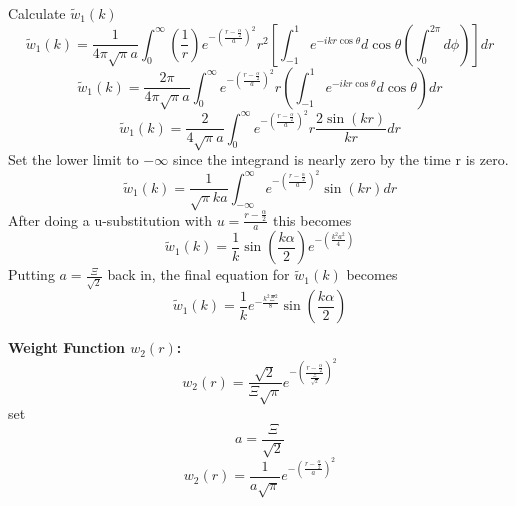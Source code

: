 \documentclass[letterpaper,twocolumn,amsmath,amssymb,prb]{revtex4-1}
\begin{document}
\begin{widetext}
\noindent Calculate $\widetilde{w}_1(k)$ 
\begin{equation}{\widetilde{w}_1(k)=\frac{1}{4{\pi}\sqrt{\pi}a}\int_{0}^{\infty}\left(\frac{1}{r}\right)e^{-\left(\frac{r-\frac{\alpha}{2}}{a}\right)^2}r^2\left[\int_{-1}^{1}e^{-ikr\cos\theta}d{\cos\theta}\left(\int_{0}^{2\pi}d{\phi}\right)\right]d{r}}\end{equation}
\[{}\]
\begin{equation}{\widetilde{w}_1(k)=\frac{2\pi}{4{\pi}\sqrt{\pi}a}\int_{0}^{\infty}e^{-\left(\frac{r-\frac{\alpha}{2}}{a}\right)^2}r\left(\int_{-1}^{1}e^{-ikr\cos\theta}d{\cos\theta}\right)d{r}}\end{equation}
\[{}\]
\begin{equation}{\widetilde{w}_1(k)=\frac{2}{4\sqrt{\pi}a}\int_{0}^{\infty}e^{-\left(\frac{r-\frac{\alpha}{2}}{a}\right)^2}r\frac{2\sin(kr)}{kr}d{r}}\end{equation}
Set the lower limit to $-\infty$ since the integrand is nearly zero by the time r is zero. 
\begin{equation}{\widetilde{w}_1(k)=\frac{1}{\sqrt{\pi}ka}\int_{-\infty}^{\infty}e^{-\left(\frac{r-\frac{\alpha}{2}}{a}\right)^2}\sin(kr)d{r}}\end{equation}
After doing a u-substitution with $u=\frac{r-\frac{\alpha}{2}}{a}$ this becomes
\begin{equation}{\widetilde{w}_1(k)=\frac{1}{k}\sin\left(\frac{k\alpha}{2}\right)e^{-\left(\frac{k^2a^2}{4}\right)}}\end{equation}
Putting $a=\frac{\Xi}{\sqrt{2}}$ back in, the final equation for $\widetilde{w}_1(k)$ becomes
\begin{equation}
    \widetilde{w}_1(k)=\frac{1}{k}e^{-\frac{k^2\Xi^2}{8}}\sin\left(\frac{k\alpha}{2}\right)
\end{equation}

\noindent\textbf{Weight Function $w_2(r)$:}
\begin{equation}{w_2(r)=\frac{\sqrt{2}}{\Xi\sqrt{\pi}}e^{-\left(\frac{r-\frac{\alpha}{2}}{\frac{\Xi}{\sqrt{2}}}\right)^2}}\end{equation}
set 
\begin{equation}{a=\frac{\Xi}{\sqrt{2}}}\end{equation}
\begin{equation}{w_2(r)=\frac{1}{a\sqrt{\pi}}e^{-\left(\frac{r-\frac{\alpha}{2}}{a}\right)^2}}\end{equation}


\end{widetext}
\end{document}
